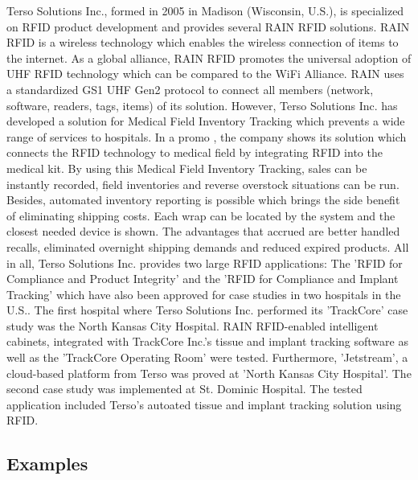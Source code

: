 Terso Solutions Inc., formed in 2005 in Madison (Wisconsin, U.S.), is specialized on RFID product development and provides several \ac{RAIN} RFID solutions. RAIN RFID \cite{rainrfid} is a wireless technology which enables the wireless connection of items to the internet. As a global alliance, RAIN RFID promotes the universal adoption of \ac{UHF} RFID technology which can be compared to the WiFi Alliance. RAIN uses a standardized GS1 UHF Gen2 protocol to connect all members (network, software, readers, tags, items) of its solution.
However, Terso Solutions Inc. has developed a solution for Medical Field Inventory Tracking which prevents a wide range of services to hospitals. In a promo \cite{terso_video}, the company shows its solution which connects the RFID technology to medical field by integrating RFID into the medical kit. By using this Medical Field Inventory Tracking, sales can be instantly recorded, field inventories and reverse overstock situations can be run. Besides, automated inventory reporting is possible which brings the side benefit of eliminating shipping costs. Each wrap can be located by the system and the closest needed device is shown. The advantages that accrued are better handled recalls, eliminated overnight shipping demands and reduced expired products. All in all, Terso Solutions Inc. provides two large RFID applications: The 'RFID for Compliance and Product Integrity' and the 'RFID for Compliance and Implant Tracking' which have also been approved for case studies in two hospitals in the U.S.. The first hospital where Terso Solutions Inc. performed its 'TrackCore' case study was the North Kansas City Hospital. RAIN RFID-enabled intelligent cabinets, integrated with TrackCore Inc.'s tissue and implant tracking software as well as the 'TrackCore Operating Room' were tested. Furthermore, 'Jetstream', a cloud-based platform from Terso was proved at 'North Kansas City Hospital'. The second case study was implemented at St. Dominic Hospital. The tested application included Terso's autoated tissue and implant tracking solution using RFID.

\subsection{Examples}







